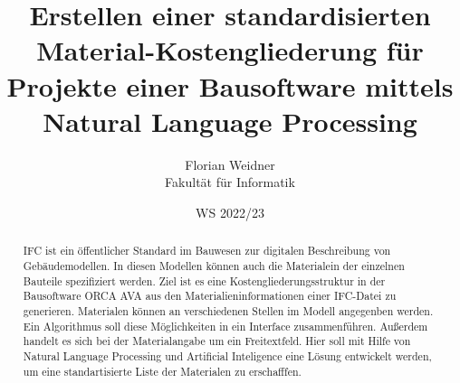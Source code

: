 \documentclass[twoside=true, %
    DIV=15
    ,%
    BCOR=15mm, %
    headinclude=true,
    footinclude=false,
    pagesize,%
    fontsize=12pt,%
    paper=a4,%
    numbers=noenddot
  ]{scrartcl}
\begin{document}
\def\figdir{figures}
\def\tabledir{tables}

\titlehead{
\raggedleft
\texttt{[image: \\figdir/logo-th-rosenheim-2019\_master\_quer\_2c.eps]}
}

\title{
\vspace*{0cm}
Erstellen einer standardisierten Material-Kostengliederung für Projekte einer Bausoftware mittels Natural Language Processing
}

\author{
Florian Weidner\\
Fakultät für Informatik}

\date{WS 2022/23}

\maketitle

\begin{abstract}
IFC ist ein öffentlicher Standard im Bauwesen zur digitalen Beschreibung von Gebäudemodellen. In diesen Modellen können auch die Materialein der einzelnen Bauteile spezifiziert werden. Ziel ist es eine Kostengliederungsstruktur in der Bausoftware ORCA AVA aus den Materialieninformationen einer IFC-Datei zu generieren. Materialen können an verschiedenen Stellen im Modell angegenben werden. Ein Algorithmus soll diese Möglichkeiten in ein Interface zusammenführen. Außerdem handelt es sich bei der Materialangabe um ein Freitextfeld. Hier soll mit Hilfe von Natural Language Processing und Artificial Inteligence eine Lösung entwickelt werden, um eine standartisierte Liste der Materialen zu erschafffen.
\end{abstract}
\pagebreak
\tableofcontents











\appendix





\end{document}
